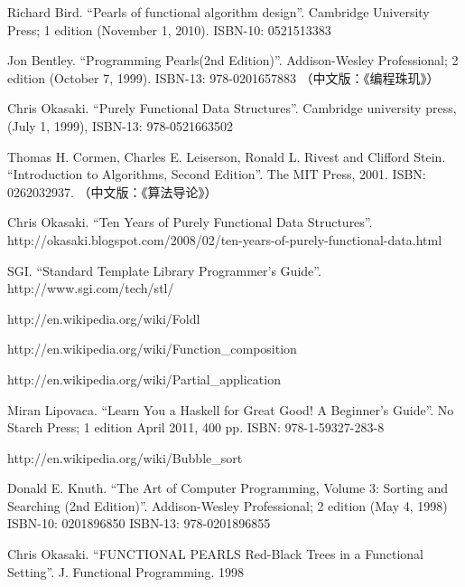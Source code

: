 \documentclass[UTF8]{article}
\begin{document}
\begin{thebibliography}{99}


Richard Bird. ``Pearls of functional algorithm design''. Cambridge University Press; 1 edition (November 1, 2010). ISBN-10: 0521513383

Jon Bentley. ``Programming Pearls(2nd Edition)''. Addison-Wesley Professional; 2 edition (October 7, 1999). ISBN-13: 978-0201657883 （中文版：《编程珠玑》）

Chris Okasaki. ``Purely Functional Data Structures''. Cambridge university press, (July 1, 1999), ISBN-13: 978-0521663502

Thomas H. Cormen, Charles E. Leiserson, Ronald L. Rivest and Clifford Stein. ``Introduction to Algorithms, Second Edition''. The MIT Press, 2001. ISBN: 0262032937. （中文版：《算法导论》）


Chris Okasaki. ``Ten Years of Purely Functional Data Structures''. http://okasaki.blogspot.com/2008/02/ten-years-of-purely-functional-data.html

SGI. ``Standard Template Library Programmer's Guide''. http://www.sgi.com/tech/stl/


http://en.wikipedia.org/wiki/Foldl

http://en.wikipedia.org/wiki/Function\_composition

http://en.wikipedia.org/wiki/Partial\_application

Miran Lipovaca. ``Learn You a Haskell for Great Good! A Beginner's Guide''. No Starch Press; 1 edition April 2011, 400 pp. ISBN: 978-1-59327-283-8

http://en.wikipedia.org/wiki/Bubble\_sort

Donald E. Knuth. ``The Art of Computer Programming, Volume 3: Sorting and Searching (2nd Edition)''. Addison-Wesley Professional; 2 edition (May 4, 1998) ISBN-10: 0201896850 ISBN-13: 978-0201896855

Chris Okasaki. ``FUNCTIONAL PEARLS Red-Black Trees in a Functional Setting''. J. Functional Programming. 1998


\end{thebibliography}
\end{document}
